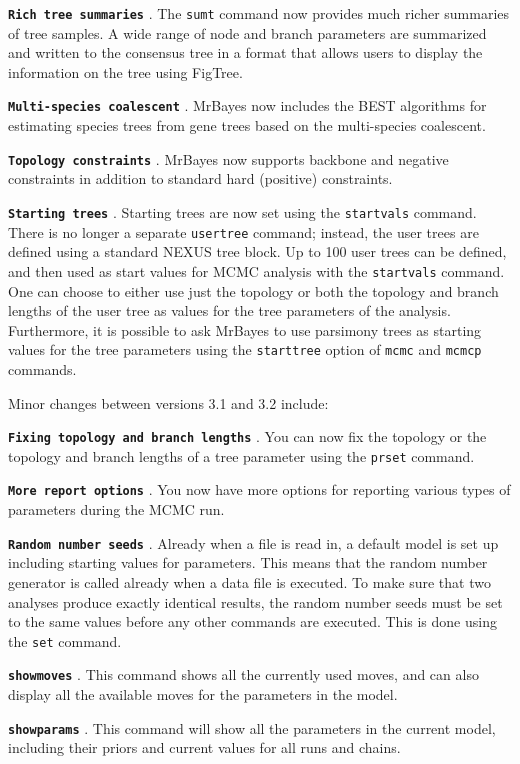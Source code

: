 \documentclass[12pt]{book}
\newcommand{\ttt}[1]{\texttt{#1} }
\newcommand{\tb}[1]{\texttt{\textbf{#1}} }
\begin{document}
\tb{Rich tree summaries}. The \ttt{sumt} command now provides much richer summaries of tree
samples. A wide range of node and branch parameters are summarized and written to the consensus
tree in a format that allows users to display the information on the tree using FigTree.

\tb{Multi-species coalescent}. MrBayes now includes the BEST algorithms for estimating species
trees from gene trees based on the multi-species coalescent.

\tb{Topology constraints}. MrBayes now supports backbone and negative constraints in addition to
standard hard (positive) constraints.

\tb{Starting trees}. Starting trees are now set using the \ttt{startvals} command. There is no
longer a separate \ttt{usertree} command; instead, the user trees are defined using a standard
NEXUS tree block. Up to 100 user trees can be defined, and then used as start values for MCMC
analysis with the \ttt{startvals} command. One can choose to either use just the topology or both
the topology and branch lengths of the user tree as values for the tree parameters of the analysis.
Furthermore, it is possible to ask MrBayes to use parsimony trees as starting values for the tree
parameters using the \ttt{starttree} option of \ttt{mcmc} and \ttt{mcmcp} commands.

Minor changes between versions 3.1 and 3.2 include:

\tb{Fixing topology and branch lengths}. You can now fix the topology or the topology and branch
lengths of a tree parameter using the \ttt{prset} command.

\tb{More report options}. You now have more options for reporting various types of parameters
during the MCMC run.

\tb{Random number seeds}. Already when a file is read in, a default model is set up including
starting values for parameters. This means that the random number generator is called already when
a data file is executed. To make sure that two analyses produce exactly identical results, the
random number seeds must be set to the same values before any other commands are executed. This is
done using the \ttt{set} command.

\tb{showmoves}. This command shows all the currently used moves, and can also display all the
available moves for the parameters in the model.

\tb{showparams}. This command will show all the parameters in the current model, including their
priors and current values for all runs and chains.
\end{document}
